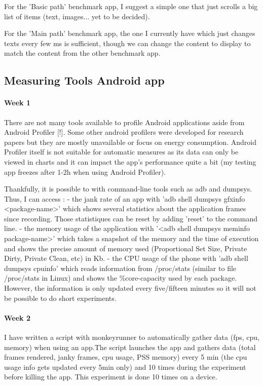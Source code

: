 \documentclass{kththesis}
\newcommand{\citationneeded}{\todo{Citation needed}[!]}
\begin{document}
For the 'Basic path' benchmark app, I suggest a simple one that just scrolls a big list of items (text, images... yet to be decided).

For the 'Main path' benchmark app, the one I currently have which just changes texts every few ms is sufficient, though we can change the content to display to match the content from the other benchmark app.




\subsection{Measuring Tools Android app}
\paragraph{Week 1}
 There are not many tools available to profile Android applications aside from Android Profiler \citationneeded. Some other android profilers were developed for research papers but they are mostly unavailable or focus on energy consumption. Android Profiler itself is not suitable for automatic measures as its data can only be viewed in charts and it can impact the app's performance quite a bit (my testing app freezes after 1-2h when using Android Profiler).

    Thankfully, it is possible to with command-line tools such as adb and dumpsys. Thus, I can access : 
            - the jank rate of an app with 'adb shell dumpsys gfxinfo <package-name>' which shows several statistics about the application frames since recording. Those statistiques can be reset by adding 'reset' to the command line. 
            - the memory usage of the application with '<adb shell dumpsys meminfo package-name>' which takes a snapshot of the memory and the time of execution and shows the precise amount of memory used (Proportional Set Size, Private Dirty, Private Clean, etc) in Kb. 
            - the CPU usage of the phone with 'adb shell dumpsys cpuinfo' which reads information from /proc/stats (similar to file /proc/stats in Linux) and shows the \%core-capacity used by each package. However, the information is only updated every five/fifteen minutes so it will not be possible to do short experiments.
\paragraph{Week 2}

I have written a script with monkeyrunner to automatically gather data (fps, cpu, memory) when using an app.The script launches the app and gathers data (total frames rendered, janky frames, cpu usage, PSS memory) every 5 min (the cpu usage info gets updated every 5min only) and 10 times during the experiment before killing the app. This experiment is done 10 times on a device.
\end{document}
